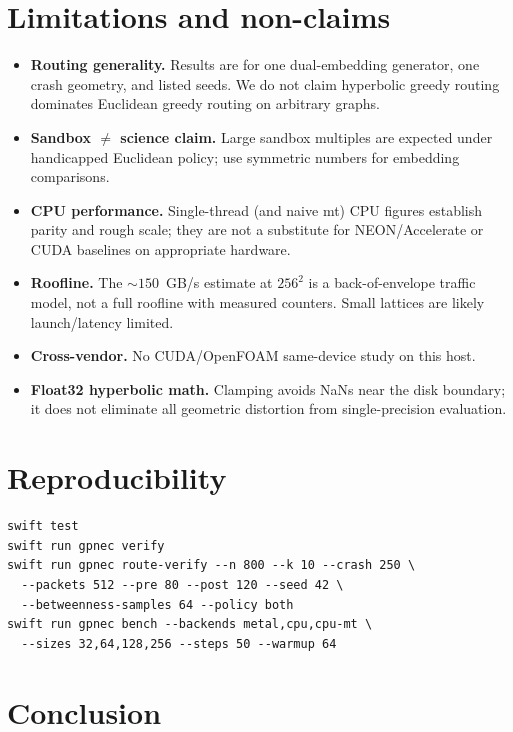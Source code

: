 \documentclass[11pt,a4paper]{article}
\begin{document}
\section{Limitations and non-claims}
\label{sec:limits}

\begin{itemize}[leftmargin=*]
  \item \textbf{Routing generality.} Results are for one dual-embedding
        generator, one crash geometry, and listed seeds. We do not claim
        hyperbolic greedy routing dominates Euclidean greedy routing on
        arbitrary graphs.
  \item \textbf{Sandbox $\neq$ science claim.} Large sandbox multiples are
        expected under handicapped Euclidean policy; use symmetric numbers
        for embedding comparisons.
  \item \textbf{CPU performance.} Single-thread (and naive mt) CPU figures
        establish parity and rough scale; they are not a substitute for
        NEON/Accelerate or CUDA baselines on appropriate hardware.
  \item \textbf{Roofline.} The $\sim150$~GB/s estimate at $256^2$ is a
        back-of-envelope traffic model, not a full roofline with measured
        counters. Small lattices are likely launch/latency limited.
  \item \textbf{Cross-vendor.} No CUDA/OpenFOAM same-device study on this
        host.
  \item \textbf{Float32 hyperbolic math.} Clamping avoids NaNs near the
        disk boundary; it does not eliminate all geometric distortion from
        single-precision evaluation.
\end{itemize}

\section{Reproducibility}
\label{sec:repro}

\begin{verbatim}
swift test
swift run gpnec verify
swift run gpnec route-verify --n 800 --k 10 --crash 250 \
  --packets 512 --pre 80 --post 120 --seed 42 \
  --betweenness-samples 64 --policy both
swift run gpnec bench --backends metal,cpu,cpu-mt \
  --sizes 32,64,128,256 --steps 50 --warmup 64
\end{verbatim}

\section{Conclusion}
\label{sec:conclusion}
\end{document}
